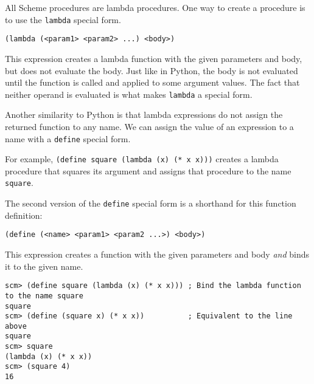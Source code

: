 All Scheme procedures are lambda procedures. One way to create a procedure is
to use the \texttt{lambda} special form.

\centerline{\lstinline{(lambda (<param1> <param2> ...) <body>)}}

This expression creates a lambda function with the given parameters and body,
but does not evaluate the body. Just like in Python, the body is not
evaluated until the function is called and applied to some argument
values. The fact that neither operand is evaluated is what makes
\texttt{lambda} a special form.

Another similarity to Python is that lambda expressions do not assign the
returned function to any name. We can assign the value of an expression to a
name with a \texttt{define} special form.

For example, \texttt{(define square (lambda (x) (* x x)))} creates a lambda
procedure that squares its argument and assigns that procedure to the name
\texttt{square}.

The second version of the \texttt{define} special form is a shorthand for this
function definition:

\centerline{\lstinline{(define (<name> <param1> <param2 ...>) <body>)}}

This expression creates a function with the given parameters and body
\emph{and} binds it to the given name.

\begin{lstlisting}
scm> (define square (lambda (x) (* x x))) ; Bind the lambda function to the name square
square
scm> (define (square x) (* x x))          ; Equivalent to the line above
square
scm> square
(lambda (x) (* x x))
scm> (square 4)
16
\end{lstlisting}
